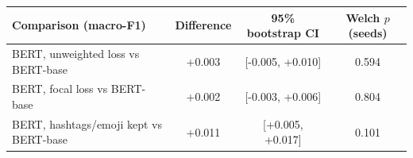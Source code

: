 \begin{tabular}{lccc}
\toprule
Comparison (macro-F1) & Difference & 95\% bootstrap CI & Welch $p$ (seeds) \\
\midrule
BERT, unweighted loss vs BERT-base & +0.003 & [-0.005, +0.010] & 0.594 \\
BERT, focal loss vs BERT-base & +0.002 & [-0.003, +0.006] & 0.804 \\
BERT, hashtags/emoji kept vs BERT-base & +0.011 & [+0.005, +0.017] & 0.101 \\
\bottomrule
\end{tabular}

